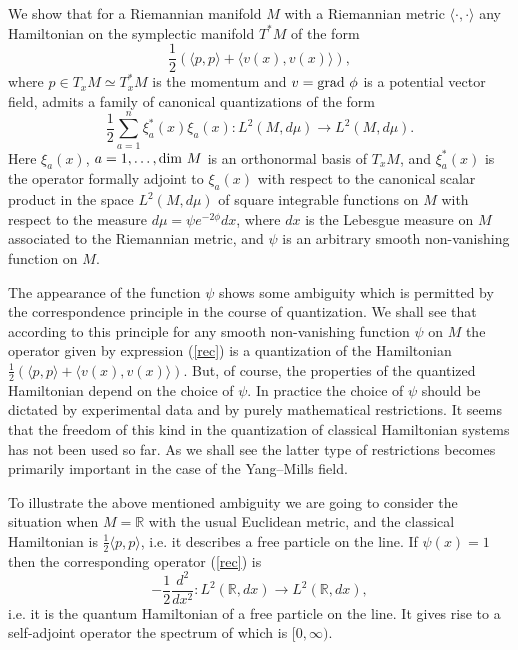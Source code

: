 \documentclass{amsart}
\begin{document}
We show that for a Riemannian manifold $M$ with a Riemannian metric $\langle \cdot,\cdot\rangle $ any Hamiltonian on the symplectic manifold $T^*M$ of the form 
\begin{equation}\label{classh}
\frac12(\langle p,p\rangle +\langle v(x),v(x)\rangle ),	
\end{equation}
where $p\in T_xM\simeq T^*_xM$ is the momentum and $v={\rm grad}~ \phi$ is a potential vector field, admits a family of canonical quantizations of the form 
\begin{equation}\label{rec}
\frac 12\sum_{a=1}^n\xi_a^*(x)\xi_a(x):L^2(M,d\mu)\rightarrow L^2(M,d\mu).		
\end{equation}
Here $\xi_a(x)$, $a=1,\ldots, {\rm dim}~M$ is an orthonormal basis of $T_xM$, and $\xi_a^*(x)$ is the operator formally adjoint to $\xi_a(x)$ with respect to the canonical scalar product in the space $L^2(M,d\mu)$ of square integrable functions on $M$ with respect to the measure $d\mu=\psi e^{-2\phi}dx$, where $dx$ is the Lebesgue measure on $M$ associated to the Riemannian metric, and $\psi$ is an arbitrary smooth non-vanishing function on $M$.

The appearance of the function $\psi$ shows some ambiguity which is permitted by the correspondence principle in the course of quantization. We shall see that according to this principle for any smooth non-vanishing function $\psi$ on $M$ the operator given by expression (\ref{rec}) is a quantization of the Hamiltonian $\frac12(\langle p,p\rangle +\langle v(x),v(x)\rangle )$. But, of course, the properties of the quantized Hamiltonian depend on the choice of $\psi$. In practice the choice of $\psi$ should be dictated by experimental data and by purely mathematical restrictions. It seems that the freedom of this kind in the quantization of classical Hamiltonian systems has not been used so far. As we shall see the latter type of restrictions becomes primarily important in the case of the Yang--Mills field. 

To illustrate the above mentioned ambiguity we are going to consider the situation when $M=\mathbb{R}$ with the usual Euclidean metric, and the classical Hamiltonian is $\frac12\langle p,p\rangle $, i.e. it describes a free particle on the line. If $\psi(x)=1$ then the corresponding operator (\ref{rec}) is 
$$
-\frac12\frac{d^2}{dx^2}:L^2(\mathbb{R}, dx)\rightarrow L^2(\mathbb{R}, dx),
$$
i.e. it is the quantum Hamiltonian of a free particle on the line. It gives rise to a self-adjoint operator the spectrum of which is $[0,\infty)$.
\end{document}
